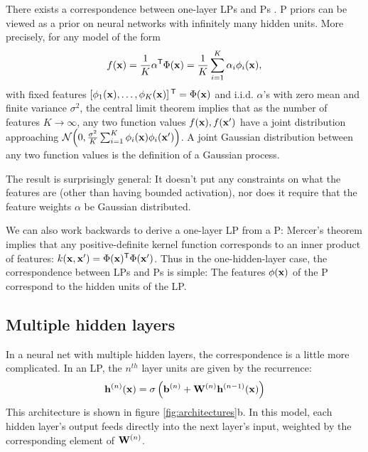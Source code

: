 \documentclass[twoside]{article}
\makeatletter
\newlength{\nonHumbleHeight}
\def\@humbleformat#1{{\settoheight{\nonHumbleHeight}{#1}\resizebox{!}{0.94\nonHumbleHeight}{#1}}}%
\def\humble#1{\@humbleformat{#1}}%
\newcommand{\gp}{{\humble GP}}
\newcommand{\MLP}{{\humble MLP}}
\makeatother
\begin{document}
There exists a correspondence between one-layer \MLP{}s and \gp{}s \citep{neal1995bayesian}.  \gp{} priors can be viewed as a prior on neural networks with infinitely many hidden units.  More precisely, for any model of the form
%
\begin{align}
f({\bf{x}}) = \frac{1}{K}{\mathbf \alpha}{^\mathsf{T}} \Phi({\bf{x}}) = \frac{1}{K} \sum_{i=1}^K \alpha_i \phi_i({\bf{x}}),
\label{eq:one-layer-nn}
\end{align}
%
with fixed features $\left[ \phi_1({\bf{x}}), \dots, \phi_K({\bf{x}}) \right]{^\ensuremath{\mathsf{T}}} = \Phi({\bf{x}})$ and i.i.d. $\alpha$'s with zero mean and finite variance $\sigma^2$, the central limit theorem implies that as the number of features $K \rightarrow \infty$, any two function values $f({\bf{x}}), f({\bf{x}}')$ have a joint distribution approaching $\mathcal{N}\!\left(0,\frac{\sigma^2}{K}\sum_{i=1}^K \phi_i({\bf{x}})\phi_i({\bf{x}}')\right)$.  A joint Gaussian distribution between any two function values is the definition of a Gaussian process.

The result is surprisingly general:  It doesn't put any constraints on what the features are (other than having bounded activation), nor does it require that the feature weights $\alpha$ be Gaussian distributed.  

We can also work backwards to derive a one-layer \MLP{} from a \gp{}:  Mercer's theorem implies that any positive-definite kernel function corresponds to an inner product of features: $k({\bf{x}}, {\bf{x}}') = \Phi({\bf{x}}) {^\mathsf{T}} \Phi({\bf{x}}')$.
%
Thus in the one-hidden-layer case, the correspondence between \MLP{}s and \gp{}s is simple:  The features $\phi({\bf{x}})$ of the \gp{} correspond to the hidden units of the \MLP{}.


\subsection{Multiple hidden layers}

In a neural net with multiple hidden layers, the correspondence is a little more complicated.  In an \MLP{}, the $n^{th}$ layer units are given by the recurrence:
%
\begin{align}
{\bf{h}}^{(n)}({\bf{x}}) = \sigma \left( {\bf{b}}^{(n)} + \mathbf{W}^{(n)} {\bf{h}}^{(n-1)}({\bf{x}}) \right)
\end{align}
%
This architecture is shown in figure \ref{fig:architectures}b.  
%
%
In this model, each hidden layer's output feeds directly into the next layer's input, weighted by the corresponding element of $\mathbf{W}^{(n)}$.  
\end{document}

